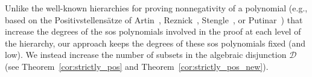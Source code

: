 \documentclass[12pt]{article}
\newcommand{\HSOS}{\widehat{\mathbf{\Sigma}}}
\newcommand{\DiSOS}{\mathbf{\Sigma}}
\newcommand{\mcD}{\mathcal{D}}
\theoremstyle{remark}
\begin{document}
Unlike the well-known hierarchies for proving nonnegativity of a polynomial (e.g., based on the Positivstellens\"atze of Artin~\cite{Artin1927}, Reznick~\cite{reznick1995uniform}, Stengle~\cite{stengle1974nullstellensatz, Parrilo2000}, or Putinar~\cite{putinar1993positive, lasserre2001global}) that increase the degrees of the sos polynomials involved in the proof at each level of the hierarchy, our approach keeps the degrees of these sos polynomials fixed (and low). 
We instead increase the number of subsets in the algebraic disjunction $\mcD$ (see Theorem~\ref{cor:strictly_pos} and Theorem~\ref{cor:strictly_pos_new}). 
\end{document}
